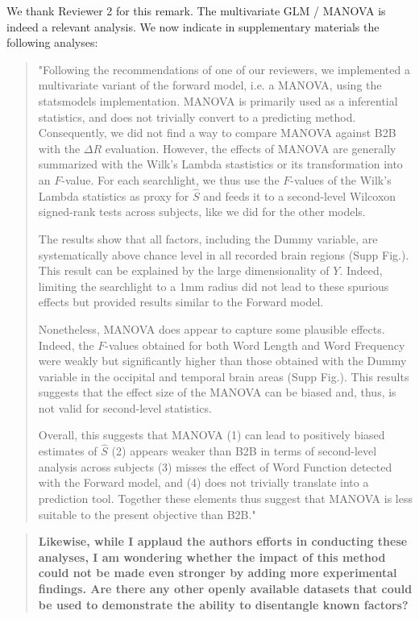 \documentclass[preprint,12pt,3p]{elsarticle}
\begin{document}
We thank Reviewer 2 for this remark. The multivariate GLM / MANOVA is indeed
a relevant analysis. We now indicate in supplementary materials the following analyses:

\begin{quote}
    "Following the recommendations of one of our reviewers, we implemented a
multivariate variant of the forward model, i.e. a MANOVA, using the statsmodels
implementation. MANOVA is primarily used as a
inferential statistics, and does not trivially convert to a predicting method.
Consequently, we did not find a way to compare MANOVA against B2B with the
$\Delta R$ evaluation. However, the effects of MANOVA are generally summarized
with the Wilk's Lambda stastistics or its transformation into an $F$-value.
For each searchlight, we thus use the $F$-values of the
Wilk's Lambda statistics as proxy for $\hat S$ and feeds it to a second-level
Wilcoxon signed-rank tests across subjects, like we did for the other models.

The results show that all factors, including the Dummy variable, are
systematically above chance level in all recorded brain regions (Supp Fig.). This result
can be explained by the large dimensionality of $Y$. Indeed, limiting the
searchlight to a 1mm radius did not lead to these spurious effects but provided
results similar to the Forward model.

Nonetheless, MANOVA does appear to capture some plausible effects. Indeed, the
$F$-values obtained for both Word Length and Word Frequency were weakly but
significantly higher than those obtained with the Dummy variable in the
occipital and temporal brain areas (Supp Fig.). This results
suggests that the effect size of the MANOVA can be biased and, thus, is not
valid for second-level statistics.

Overall, this suggests that MANOVA (1) can lead to positively biased estimates of
$\hat S$ (2) appears weaker than B2B in terms of second-level analysis across
subjects (3) misses the effect of Word Function detected with the Forward model,
and (4) does not trivially translate into a prediction tool. Together these
elements thus suggest that MANOVA is less suitable to the present objective than
B2B."

\end{quote}

\begin{quote}\textbf{
Likewise, while I applaud the authors efforts in conducting these analyses,
    I am wondering whether the impact of this method could not be made even
    stronger by adding more experimental findings. Are there any other openly
    available datasets that could be used to demonstrate the ability to
    disentangle known factors?
}
\end{quote}
\end{document}
